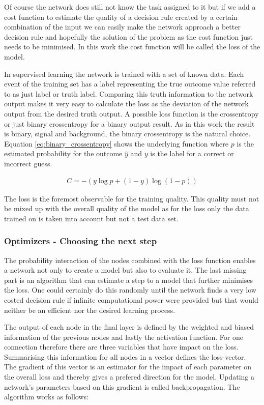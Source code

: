 Of course the network does still not know the task assigned to it but if we add a cost function to estimate the quality of a decision rule created by a certain combination of the input we can easily make the network approach a better decision rule and hopefully the solution of the problem as the cost function just needs to be minimised. In this work the cost function will be called the loss of the model.

In supervised learning the network is trained with a set of known data. Each event of the training set has a label representing the true outcome value referred to as just label or truth label. Comparing this truth information to the network output makes it very easy to calculate the loss as the deviation of the network output from the desired truth output. A possible loss function is the crossentropy or just binary crossentropy for a binary output result. As in this work the result is binary, signal and background, the binary crossentropy is the natural choice. Equation \eqref{eq:binary_crossentropy} shows the underlying function where $p$ is the estimated probability for the outcome $\hat{y}$ and $y$ is the label for a  correct or incorrect guess.

\begin{align}
    C = -(y \log p + (1 - y) \log (1 - p) )
    \label{eq:binary_crossentropy}
\end{align}

The loss is the foremost observable for the training quality. This quality must not be mixed up with the overall quality of the model as for the loss only the data trained on is taken into account but not a test data set.

\subsubsection{Optimizers - Choosing the next step}

The probability interaction of the nodes combined with the loss function enables a network not only to create a model but also to evaluate it. The last missing part is an algorithm that can estimate a step to a model that further minimises the loss. One could certainly do this randomly until the network finds a very low costed decision rule if infinite computational power were provided but that would neither be an efficient nor the desired learning process.

The output of each node in the final layer is defined by the weighted and biased information of the previous nodes and lastly the activation function. For one connection therefore there are three variables that have impact on the loss. Summarising this information for all nodes in a vector defines the loss-vector. The gradient of this vector is an estimator for the impact of each parameter on the overall loss and thereby gives a prefered direction for the model. Updating a network's parameters based on this gradient is called backpropagation. The algorithm works as follows:

